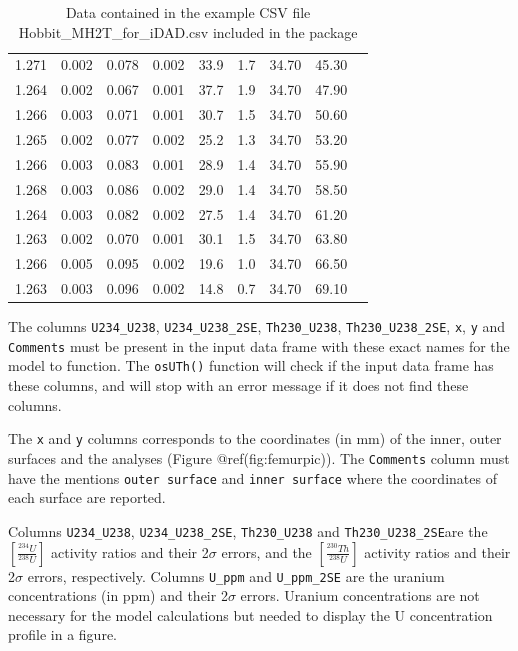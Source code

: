 \documentclass[]{elsarticle} %
\begin{document}
\begin{table}[ht]
\begin{tabular}{ccccccccc}
  1.271 & 0.002 & 0.078 & 0.002 & 33.9 & 1.7 & 34.70 & 45.30 &  \\ 
  1.264 & 0.002 & 0.067 & 0.001 & 37.7 & 1.9 & 34.70 & 47.90 &  \\ 
  1.266 & 0.003 & 0.071 & 0.001 & 30.7 & 1.5 & 34.70 & 50.60 &  \\ 
  1.265 & 0.002 & 0.077 & 0.002 & 25.2 & 1.3 & 34.70 & 53.20 &  \\ 
  1.266 & 0.003 & 0.083 & 0.001 & 28.9 & 1.4 & 34.70 & 55.90 &  \\ 
  1.268 & 0.003 & 0.086 & 0.002 & 29.0 & 1.4 & 34.70 & 58.50 &  \\ 
  1.264 & 0.003 & 0.082 & 0.002 & 27.5 & 1.4 & 34.70 & 61.20 &  \\ 
  1.263 & 0.002 & 0.070 & 0.001 & 30.1 & 1.5 & 34.70 & 63.80 &  \\ 
  1.266 & 0.005 & 0.095 & 0.002 & 19.6 & 1.0 & 34.70 & 66.50 &  \\ 
  1.263 & 0.003 & 0.096 & 0.002 & 14.8 & 0.7 & 34.70 & 69.10 &  \\ 
   \hline
\end{tabular}
\caption{\label{tab:hobbitone}Data contained in the example CSV file Hobbit\_MH2T\_for\_iDAD.csv included in the package} 
\end{table}

The columns \texttt{U234\_U238}, \texttt{U234\_U238\_2SE}, \texttt{Th230\_U238}, \texttt{Th230\_U238\_2SE}, \texttt{x}, \texttt{y} and \texttt{Comments} must be present in the input data frame with these exact names for the model to function. The \texttt{osUTh()} function will check if the input data frame has these columns, and will stop with an error message if it does not find these columns.

The \texttt{x} and \texttt{y} columns corresponds to the coordinates (in mm) of the inner, outer surfaces and the analyses (Figure @ref(fig:femurpic)). The \texttt{Comments} column must have the mentions \texttt{outer\ surface} and \texttt{inner\ surface} where the coordinates of each surface are reported.

Columns \texttt{U234\_U238}, \texttt{U234\_U238\_2SE}, \texttt{Th230\_U238} and \texttt{Th230\_U238\_2SE}are the \([\frac{^{234}U}{^{238}U}]\) activity ratios and their 2\(\sigma\) errors, and the \([\frac{^{230}Th}{^{238}U}]\) activity ratios and their 2\(\sigma\) errors, respectively.
Columns \texttt{U\_ppm} and \texttt{U\_ppm\_2SE} are the uranium concentrations (in ppm) and their 2\(\sigma\) errors. Uranium concentrations are not necessary for the model calculations but needed to display the U concentration profile in a figure.
\end{document}
